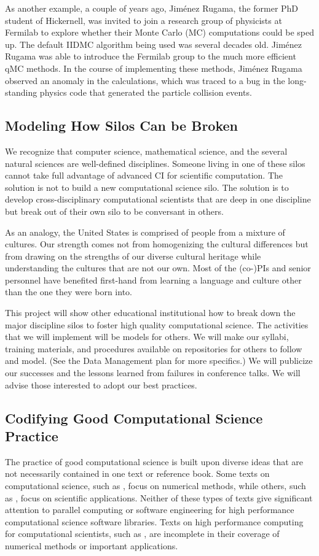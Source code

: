 \documentclass[11pt]{NSFamsart}
\begin{document}
As another example, a couple of years ago, Jim\'enez Rugama, the former PhD student of Hickernell, was invited to join a research group of physicists at Fermilab to explore whether their Monte Carlo (MC) computations could be sped up.  The default IIDMC algorithm being used was several decades old.  Jim\'enez Rugama was able to introduce the Fermilab group to the much more efficient qMC methods.  In the course of implementing these methods, Jim\'enez Rugama observed an anomaly in the calculations, which was traced to a bug in the long-standing physics code that generated the particle collision events.

\subsection{Modeling How Silos Can be Broken}
We recognize that computer science, mathematical science, and the several natural sciences are well-defined disciplines.  Someone living in one of these silos cannot take full advantage of advanced CI for scientific computation.  The solution is not to build a new computational science silo.  The solution is to develop cross-disciplinary computational scientists that are deep in one discipline but break out of their own silo to be conversant in others.

As an analogy, the United States is comprised of people from a mixture of cultures.  Our strength comes not from homogenizing the cultural differences but from drawing on the strengths of our diverse cultural heritage while understanding the cultures that are not our own.  Most of the {(co-)PIs} and senior personnel have benefited first-hand from learning a language and culture other than the one they were born into.

This project will show other educational institutional how to break down the major discipline silos to foster high quality computational science.  The activities that we will implement will be models for others.  We will make our syllabi, training materials, and procedures available on repositories for others to follow and model. (See the Data Management plan for more specifics.) We will publicize our successes and the lessons learned from failures in conference talks.  We will advise those interested to adopt our best practices.

\subsection{Codifying Good Computational Science Practice}
The practice of good computational science is built upon diverse ideas that are not necessarily contained in one text or reference book.  Some texts on computational science, such as \cite{TveEtal10a}, focus on numerical methods, while others, such as \cite{Thi13a}, focus on scientific applications.  Neither of these types of texts give significant attention to parallel computing or software engineering for high performance computational science software libraries. Texts on high performance computing for computational scientists, such as \cite{MagEtal16a}, are incomplete in their coverage of numerical methods or important applications.
\end{document}
